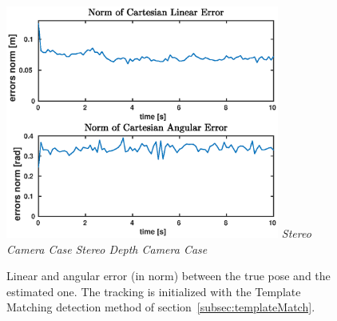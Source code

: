 \begin{figure}
{		\includegraphics[width=9cm]{tracking/templ-depth.eps}
	}
	\hspace*{20px}\textit{Stereo Camera Case} \hspace{135px} \textit{Stereo Depth Camera Case}\\
	\vspace{30px}
	\caption[Tracking error plots with Template Matching detection initialization]{Linear and angular error (in norm) between the true pose and the estimated one. The tracking is initialized with the Template Matching detection method of \mbox{section \ref{subsec:templateMatch}}.}
	\label{fig:templateErrors}
\end{figure}